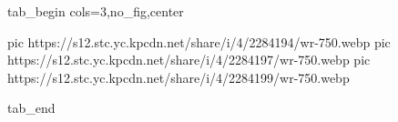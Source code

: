  
 
 
 
 

\ifcmt
  tab_begin cols=3,no_fig,center

     pic https://s12.stc.yc.kpcdn.net/share/i/4/2284194/wr-750.webp
		 pic https://s12.stc.yc.kpcdn.net/share/i/4/2284197/wr-750.webp
		 pic https://s12.stc.yc.kpcdn.net/share/i/4/2284199/wr-750.webp

  tab_end
\fi

\begin{center}
\end{center}
